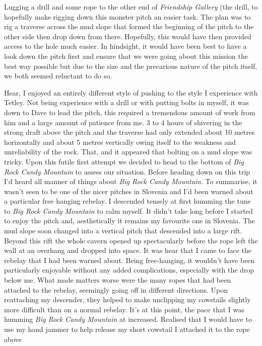 Lugging a drill and some rope to the other end of \emph{Friendship
Gallery} (the drill, to hopefully make rigging down this monster pitch
an easier task. The plan was to rig a traverse across the mud slope that
formed the beginning of the pitch to the other side then drop down from
there. Hopefully, this would have then provided access to the hole much
easier. In hindsight, it would have been best to have a look down the
pitch first and ensure that we were going about this mission the best
way possible but due to the size and the precarious nature of the pitch
itself, we both seemed reluctant to do so.

Hear, I enjoyed an entirely different style of pushing to the style I
experience with Tetley. Not being experience with a drill or with
putting bolts in myself, it was down to Dave to lead the pitch, this
required a tremendous amount of work from him and a large amount of
patience from me. 3 to 4 hours of shivering in the strong draft above
the pitch and the traverse had only extended about 10 metres
horizontally and about 5 metres vertically owing itself to the weakness
and unreliability of the rock. That, and it appeared that bolting on a
mud slope was tricky. Upon this futile first attempt we decided to head
to the bottom of \emph{Big Rock Candy Mountain} to assess our situation.
Before heading down on this trip I'd heard all manner of things about
\emph{Big Rock Candy Mountain}. To summarise, it wasn't seen to be one
of the nicer pitches in Slovenia and I'd been warned about a particular
free hanging rebelay. I descended tensely at first humming the tune to
\emph{Big Rock Candy Mountain} to calm myself. It didn't take long
before I started to enjoy the pitch and, aesthetically it remains my
favourite one in Slovenia. The mud slope soon changed into a vertical
pitch that descended into a large rift. Beyond this rift the whole
cavern opened up spectacularly before the rope left the wall at an
overhang and dropped into space. It was hear that I came to face the
rebelay that I had been warned about. Being free-hanging, it wouldn't
have been particularly enjoyable without any added complications,
especially with the drop below me. What made matters worse were the many
ropes that had been attached to the rebelay, seemingly going off in
different directions. Upon reattaching my descender, they helped to make
unclipping my cowstails slightly more difficult than on a normal
rebelay. It's at this point, the pace that I was humming \emph{Big Rock
Candy Mountain} at increased. Realised that I would have to use my hand
jammer to help release my short cowstail I attached it to the rope above
